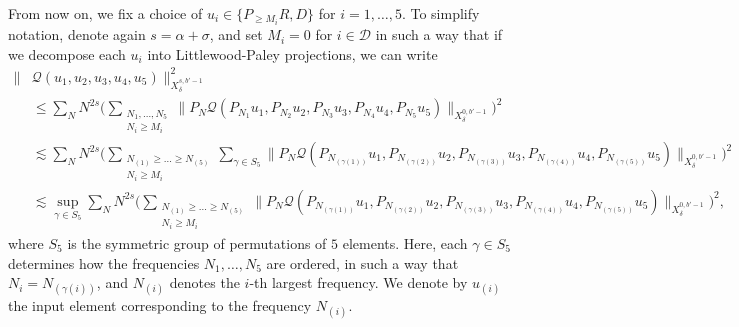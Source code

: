 \documentclass[11pt, xcolor = dvipsnames,reqno
]{amsart}
\theoremstyle{definition}
\theoremstyle{remark}
\begin{document}
From now on, we fix a choice of 
$u_i \in \{ P_{\geq M_i} R, D\}$ for $i = 1, \ldots, 5$. 
%
To simplify notation, denote again $s = \alpha + \sigma$, and set $M_i = 0$ for $i \in \mathcal D$ in such a way that if we decompose each $u_i$ into Littlewood-Paley projections, we can write
\begin{align}\label{eq:decomp-lp}
    \lVert& \mathcal{Q}(u_1, u_2, u_3, u_4, u_5) \rVert_{X^{s,b'-1}_\delta}^2 \\
    & \leq  
    \sum_N
    N^{2s} 
    \bigg( 
    \sum_{\substack{N_1, \ldots, N_5 \\ N_i \geq M_i }} \lVert P_N \mathcal{Q}(P_{N_1}u_{1}, P_{N_2}u_{2}, P_{N_3} u_{3}, P_{N_4}u_{4}, P_{N_5}u_{5}) \rVert_{X^{0,b'-1}_\delta} \bigg)^2  \\
    & \lesssim 
    \sum_N
    N^{2s} \bigg( 
    \sum_{\substack{N_{(1)}\geq \ldots\geq N_{(5)} \\ N_i \geq M_i}} \sum_{\gamma \in S_5} \lVert P_N \mathcal{Q} (P_{N_{(\gamma(1))}}u_{1}, P_{N_{(\gamma(2))}}u_{2}, P_{N_{(\gamma(3))}} u_{3}, P_{N_{(\gamma(4))}}u_{4}, P_{N_{(\gamma(5))}}u_{5}) \rVert_{X^{0,b'-1}_\delta} \bigg)^2  \\
    & \lesssim 
    \sup_{\gamma \in S_5}
    \sum_N
    N^{2s} 
    \bigg( 
    \sum_{\substack{N_{(1)}\geq \ldots\geq N_{(5)} \\ N_i \geq M_i}}  \lVert P_N \mathcal{Q} (P_{N_{(\gamma(1))}}u_{1}, P_{N_{(\gamma(2))}}u_{2}, P_{N_{(\gamma(3))}} u_{3}, P_{N_{(\gamma(4))}}u_{4}, P_{N_{(\gamma(5))}}u_{5}) \rVert_{X^{0,b'-1}_\delta} \bigg)^2, 
\end{align}
where $S_5$ is the symmetric group of permutations of $5$ elements. 
Here, each $\gamma \in S_5$ determines how the frequencies $N_1, \ldots, N_5$ are ordered, in such a way that $N_i = N_{(\gamma(i))}$, and $N_{(i)}$ denotes the $i$-th largest frequency.
We denote by $u_{(i)}$ the input element corresponding to the frequency $N_{(i)}$. 
\end{document}

